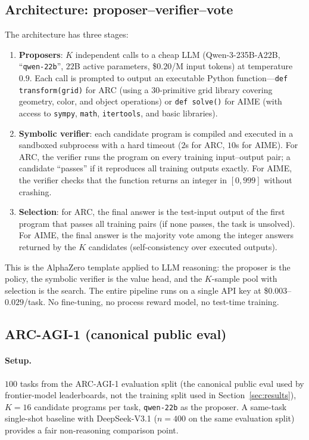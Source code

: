 \documentclass[11pt]{amsart}
\newcommand\1{{\mathds{1}}}
\theoremstyle{definition}
\theoremstyle{remark}
\numberwithin{equation}{section}
\begin{document}
\subsection{Architecture: proposer--verifier--vote}\label{sec:act2-arch}

The architecture has three stages:
\begin{enumerate}[leftmargin=1.4em, itemsep=2pt]
\item \textbf{Proposers}: $K$ independent calls to a cheap LLM (Qwen-3-235B-A22B, ``\texttt{qwen-22b}'', $22$B active parameters, \$$0.20$/M input tokens) at temperature $0.9$.
Each call is prompted to output an executable Python function---\texttt{def transform(grid)} for ARC (using a $30$-primitive grid library covering geometry, color, and object operations) or \texttt{def solve()} for AIME (with access to \texttt{sympy}, \texttt{math}, \texttt{itertools}, and basic libraries).
\item \textbf{Symbolic verifier}: each candidate program is compiled and executed in a sandboxed subprocess with a hard timeout ($2$s for ARC, $10$s for AIME).
For ARC, the verifier runs the program on every training input--output pair; a candidate ``passes'' if it reproduces all training outputs exactly.
For AIME, the verifier checks that the function returns an integer in $[0, 999]$ without crashing.
\item \textbf{Selection}: for ARC, the final answer is the test-input output of the first program that passes all training pairs (if none passes, the task is unsolved).
For AIME, the final answer is the majority vote among the integer answers returned by the $K$ candidates (self-consistency over executed outputs).
\end{enumerate}

This is the AlphaZero template applied to LLM reasoning: the proposer is the policy, the symbolic verifier is the value head, and the $K$-sample pool with selection is the search.
The entire pipeline runs on a single API key at \$$0.003$--$0.029$/task.
No fine-tuning, no process reward model, no test-time training.

\subsection{ARC-AGI-1 (canonical public eval)}\label{sec:act2-arc}

\paragraph{Setup.}
$100$ tasks from the ARC-AGI-1 evaluation split (the canonical public eval used by frontier-model leaderboards, not the training split used in Section~\ref{sec:results}), $K\!=\!16$ candidate programs per task, \texttt{qwen-22b} as the proposer.
A same-task single-shot baseline with DeepSeek-V3.1 ($n\!=\!400$ on the same evaluation split) provides a fair non-reasoning comparison point.
\end{document}

